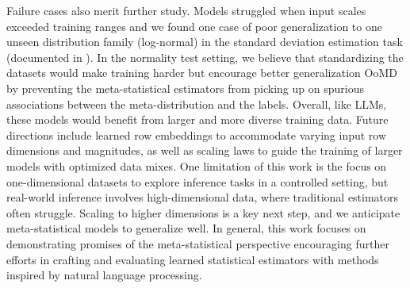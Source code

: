 Failure cases also merit further study. Models struggled when input scales exceeded training ranges and we found one case of poor generalization to one unseen distribution family (log-normal) in the standard deviation estimation task (documented in ). In the normality test setting, we believe that standardizing the datasets would make training harder but encourage better generalization OoMD by preventing the meta-statistical estimators from picking up on spurious associations between the meta-distribution and the labels. Overall, like LLMs, these models would benefit from larger and more diverse training data. Future directions include learned row embeddings to accommodate varying input row dimensions and magnitudes, as well as scaling laws to guide the training of larger models with optimized data mixes. One limitation of this work is the focus on one-dimensional datasets to explore inference tasks in a controlled setting, but real-world inference involves high-dimensional data, where traditional estimators often struggle. Scaling to higher dimensions is a key next step, and we anticipate meta-statistical models to generalize well. In general, this work focuses on demonstrating promises of the meta-statistical perspective encouraging further efforts in crafting and evaluating learned statistical estimators with methods inspired by natural language processing.
